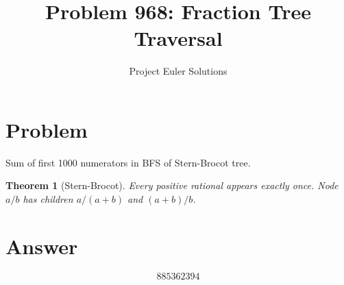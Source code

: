 \documentclass[11pt]{article}
\title{Problem 968: Fraction Tree Traversal}
\author{Project Euler Solutions}
\date{}
\newtheorem{theorem}{Theorem}
\begin{document}
\maketitle
\section{Problem}
Sum of first 1000 numerators in BFS of Stern-Brocot tree.
\begin{theorem}[Stern-Brocot]
Every positive rational appears exactly once. Node $a/b$ has children $a/(a+b)$ and $(a+b)/b$.
\end{theorem}
\section{Answer}

\[
\boxed{885362394}
\]
\end{document}

